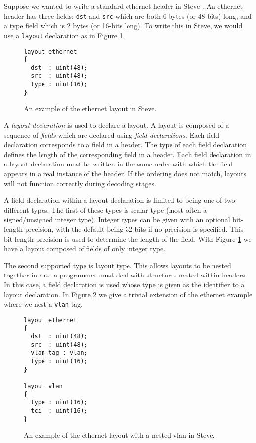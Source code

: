 Suppose we wanted to write a standard ethernet header in Steve \cite{eth_std}. An ethernet header has three fields; \texttt{dst} and \texttt{src} which are both 6 bytes (or 48-bits) long, and a type field which is 2 bytes (or 16-bits long). To write this in Steve, we would use a \texttt{layout} declaration as in Figure \ref{fg:eth_layout_ex}.

\begin{figure}[ht]
\begin{lstlisting}
layout ethernet
{
  dst  : uint(48);
  src  : uint(48);
  type : uint(16);
}
\end{lstlisting}
\caption{An example of the ethernet layout in Steve.}
\label{fg:eth_layout_ex}
\end{figure}

A \textit{layout declaration} is used to declare a layout. A layout is composed of a sequence of \textit{fields} which are declared using \textit{field declarations}. Each field declaration corresponds to a field in a header. The type of each field declaration defines the length of the corresponding field in a header. Each field declaration in a layout declaration must be written in the same order with which the field appears in a real instance of the header. If the ordering does not match, layouts will not function correctly during decoding stages.   

A field declaration within a layout declaration is limited to being one of two different types. The first of these types is scalar type (most often a signed/unsigned integer type). Integer types can be given with an optional bit-length precision, with the default being 32-bits if no precision is specified. This bit-length precision is used to determine the length of the field. With Figure \ref{fg:eth_layout_ex} we have a layout composed of fields of only integer type.

The second supported type is layout type. This allows layouts to be nested together in case a programmer must deal with structures nested within headers. In this case, a field declaration is used whose type is given as the identifier to a layout declaration. In Figure \ref{fg:nested_layout_ex} we give a trivial extension of the ethernet example where we nest a \texttt{vlan} tag.

\begin{figure}[ht]
\begin{lstlisting}
layout ethernet
{
  dst  : uint(48);
  src  : uint(48);
  vlan_tag : vlan;
  type : uint(16);
}

layout vlan
{
  type : uint(16);
  tci  : uint(16);
}
\end{lstlisting}
\caption{An example of the ethernet layout with a nested vlan in Steve.}
\label{fg:nested_layout_ex}
\end{figure}

